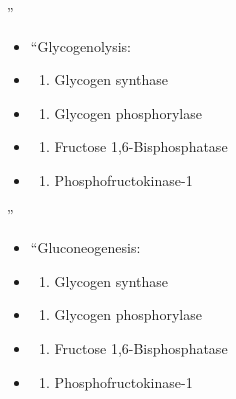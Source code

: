 \documentclass[
]{book}
\providecommand{\tightlist}{%
  \setlength{\itemsep}{0pt}\setlength{\parskip}{0pt}}
\begin{document}
''

\begin{itemize}
\item
  ``Glycogenolysis:
\item
  \begin{enumerate}
  \def\labelenumi{(\Alph{enumi})}
  \tightlist
  \item
    Glycogen synthase\\
  \end{enumerate}
\item
  \begin{enumerate}
  \def\labelenumi{(\Alph{enumi})}
  \setcounter{enumi}{1}
  \tightlist
  \item
    Glycogen phosphorylase\\
  \end{enumerate}
\item
  \begin{enumerate}
  \def\labelenumi{(\Alph{enumi})}
  \setcounter{enumi}{2}
  \tightlist
  \item
    Fructose 1,6-Bisphosphatase\\
  \end{enumerate}
\item
  \begin{enumerate}
  \def\labelenumi{(\Alph{enumi})}
  \setcounter{enumi}{3}
  \tightlist
  \item
    Phosphofructokinase-1
  \end{enumerate}
\end{itemize}

''

\begin{itemize}
\item
  ``Gluconeogenesis:
\item
  \begin{enumerate}
  \def\labelenumi{(\Alph{enumi})}
  \tightlist
  \item
    Glycogen synthase\\
  \end{enumerate}
\item
  \begin{enumerate}
  \def\labelenumi{(\Alph{enumi})}
  \setcounter{enumi}{1}
  \tightlist
  \item
    Glycogen phosphorylase\\
  \end{enumerate}
\item
  \begin{enumerate}
  \def\labelenumi{(\Alph{enumi})}
  \setcounter{enumi}{2}
  \tightlist
  \item
    Fructose 1,6-Bisphosphatase\\
  \end{enumerate}
\item
  \begin{enumerate}
  \def\labelenumi{(\Alph{enumi})}
  \setcounter{enumi}{3}
  \tightlist
  \item
    Phosphofructokinase-1
  \end{enumerate}
\end{itemize}
\end{document}
